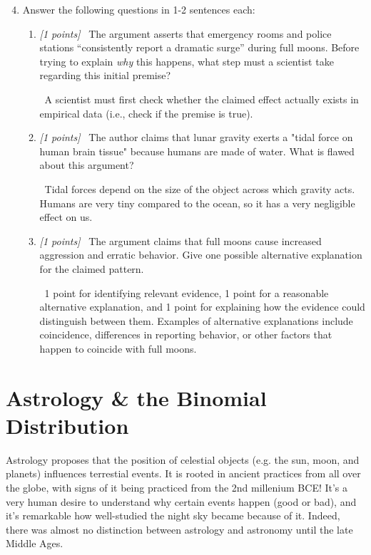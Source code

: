 \documentclass[11pt]{article}
\newcommand{\pts}[1]{\textit{[#1 points]}\ }
\newcommand{\ans}[1]{%
  \par\smallskip\noindent{\color{blue!55!black}\textbf{Answer:}}\ #1\par\smallskip}
\begin{document}
\begin{enumerate}
    \setcounter{enumi}{3}
    \item Answer the following questions in 1-2 sentences each:
    \begin{enumerate}[label=(\alph*)]

    \item \pts{1} The argument asserts that emergency rooms and police stations ``consistently report a dramatic surge'' during full moons. Before trying to explain \emph{why} this happens, what step must a scientist take regarding this initial premise?

\ans{A scientist must first check whether the claimed effect actually exists in empirical data (i.e., check if the premise is true). }


        \item \pts{1} The author claims that lunar gravity exerts a "tidal force on human brain tissue" because humans are made of water. What is flawed about this  argument? 
        
        \ans{Tidal forces depend on the size of the object across which gravity acts. Humans are very tiny compared to the ocean, so it has a very negligible effect on us.}


        \item \pts{1} The argument claims that full moons cause increased
        aggression and erratic behavior. Give one possible alternative
        explanation for the claimed pattern.
        
        \ans{1 point for identifying relevant evidence, 1 point for a reasonable
        alternative explanation, and 1 point for explaining how the evidence
        could distinguish between them. Examples of alternative explanations
        include coincidence, differences in reporting behavior, or other factors
        that happen to coincide with full moons.}

        
    \end{enumerate}
\end{enumerate}

\section{Astrology \& the Binomial Distribution}

Astrology proposes that the position of celestial objects (e.g. the sun, moon, and planets) influences terrestial events. It is rooted in ancient practices from all over the globe, with signs of it being practiced from the 2nd millenium BCE! It's a very human desire to understand why certain events happen (good or bad), and it's remarkable how well-studied the night sky became because of it. Indeed, there was almost no distinction between astrology and astronomy until the late Middle Ages.
\end{document}
